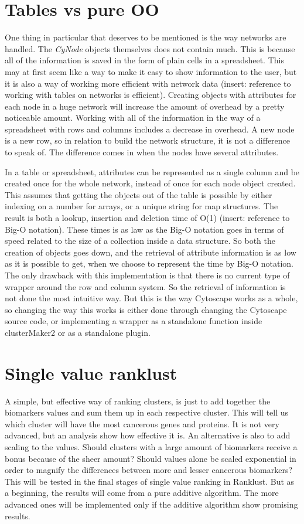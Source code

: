 \section{Tables vs pure OO}
One thing in particular that deserves to be mentioned is the way networks are
handled. The \textit{CyNode} objects themselves does not contain much. This is
because all of the information is saved in the form of plain cells in a
spreadsheet. This may at first seem like a way to make it easy to show
information to the user, but it is also a way of working more efficient with
network data (insert: reference to working with tables on networks is
efficient). Creating objects with attributes for each node in a huge network
will increase the amount of overhead by a pretty noticeable amount. Working with
all of the information in the way of a spreadsheet with rows and columns
includes a decrease in overhead. A new node is a new row, so in relation to
build the network structure, it is not a difference to speak of.  The difference
comes in when the nodes have several attributes. 

In a table or spreadsheet, attributes can be represented as a single column and
be created once for the whole network, instead of once for each node object
created. This assumes that getting the objects out of the table is possible by
either indexing on a number for arrays, or a unique string for map structures.
The result is both a lookup, insertion and deletion time of O(1) (insert:
reference to Big-O notation).  These times is as law as the Big-O notation goes
in terms of speed related to the size of a collection inside a data structure.
So both the creation of objects goes down, and the retrieval of attribute
information is as low as it is possible to get, when we choose to represent the
time by Big-O notation. The only drawback with this implementation is that there
is no current type of wrapper around the row and column system. So the retrieval
of information is not done the most intuitive way. But this is the way Cytoscape
works as a whole, so changing the way this works is either done through changing
the Cytoscape source code, or implementing a wrapper as a standalone function
inside clusterMaker2 or as a standalone plugin.

\section{Single value ranklust}
A simple, but effective way of ranking clusters, is just to add together the
biomarkers values and sum them up in each respective cluster. This will tell us
which cluster will have the most cancerous genes and proteins. It is not very
advanced, but an analysis show how effective it is. An alternative is also to
add scaling to the values. Should clusters with a large amount of biomarkers
receive a bonus because of the sheer amount? Should values alone be scaled
exponential in order to magnify the differences between more and lesser
cancerous biomarkers? This will be tested in the final stages of single value
ranking in Ranklust. But as a beginning, the results will come from a pure
additive algorithm.  The more advanced ones will be implemented only if the
additive algorithm show promising results.

